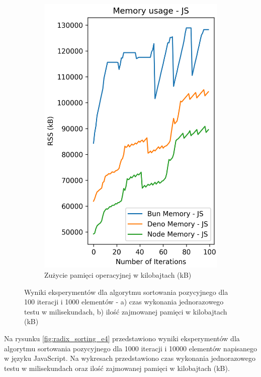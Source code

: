 \begin{figure}[H]
\begin{subfigure}[b]{0.42\textwidth}
    \includegraphics[width=\textwidth]{Figures/sorting/sorting_radix_100_10000_js_memory.png}
    \caption{Zużycie pamięci operacyjnej w kilobajtach (kB)}
    \label{fig:radix_sorting_e3_ts_memory}
  \end{subfigure}
  \hfill
  \caption{Wyniki eksperymentów dla algorytmu sortowania pozycyjnego dla 100 iteracji i 1000 elementów - a) czas wykonania jednorazowego testu w milisekundach, b) ilość zajmowanej pamięci w kilobajtach (kB)}
  \label{fig:radix_sorting_e3_ts}
\end{figure}

Na rysunku \ref{fig:radix_sorting_e4} przedstawiono wyniki eksperymentów dla algorytmu sortowania pozycyjnego dla 1000 iteracji i 10000 elementów napisanego w języku JavaScript. Na wykresach przedstawiono czas wykonania jednorazowego testu w milisekundach oraz ilość zajmowanej pamięci w kilobajtach (kB).

